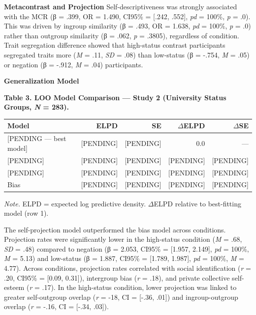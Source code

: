 \documentclass[
  man,
  longtable,
  nolmodern,
  notxfonts,
  notimes,
  man]{apa7}
\begin{document}
\textbf{Metacontrast and Projection} Self-descriptiveness was strongly
associated with the MCR (β = .399, OR = 1.490, CI95\% = {[}.242,
.552{]}, \emph{pd} = 100\%, \emph{p} = .0). This was driven by ingroup
similarity (β = .493, OR = 1.638, \emph{pd} = 100\%, \emph{p} = .0)
rather than outgroup similarity (β = .062, \emph{p} = .3805), regardless
of condition. Trait segregation difference showed that high-status
contrast participants segregated traits more (\emph{M} = .11, \emph{SD}
= .08) than low-status (β = -.754, \emph{M} = .05) or negation (β =
-.912, \emph{M} = .04) participants.

\textbf{Generalization Model}

\textbf{Table 3. LOO Model Comparison --- Study 2 (University Status
Groups, \emph{N} = 283).}

\begin{longtable}[]{@{}lrrrr@{}}
\toprule\noalign{}
Model & ELPD & SE & \(\Delta\)ELPD & \(\Delta\)SE \\
\midrule\noalign{}
\endhead
\bottomrule\noalign{}
\endlastfoot
{[}PENDING --- best model{]} & {[}PENDING{]} & {[}PENDING{]} & 0.0 &
--- \\
{[}PENDING{]} & {[}PENDING{]} & {[}PENDING{]} & {[}PENDING{]} &
{[}PENDING{]} \\
{[}PENDING{]} & {[}PENDING{]} & {[}PENDING{]} & {[}PENDING{]} &
{[}PENDING{]} \\
Bias & {[}PENDING{]} & {[}PENDING{]} & {[}PENDING{]} & {[}PENDING{]} \\
\end{longtable}

\emph{Note.} ELPD = expected log predictive density. \(\Delta\)ELPD
relative to best-fitting model (row 1).

The self-projection model outperformed the bias model across conditions.
Projection rates were significantly lower in the high-status condition
(\emph{M} = .68, \emph{SD} = .48) compared to negation (β = 2.053,
CI95\% = {[}1.957, 2.149{]}, \emph{pd} = 100\%, \emph{M} = 5.13) and
low-status (β = 1.887, CI95\% = {[}1.789, 1.987{]}, \emph{pd} = 100\%,
\emph{M} = 4.77). Across conditions, projection rates correlated with
social identification (\emph{r} = .20, CI95\% = {[}0.09, 0.31{]}),
intergroup bias (\emph{r} = .18), and private collective self-esteem
(\emph{r} = .17). In the high-status condition, lower projection was
linked to greater self-outgroup overlap (\emph{r} = -18, CI = {[}-.36,
.01{]}) and ingroup-outgroup overlap (\emph{r} = -.16, CI = {[}-.34,
.03{]}).
\end{document}

